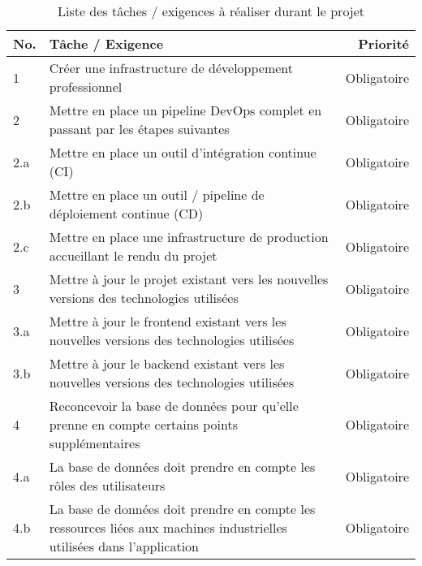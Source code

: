 \documentclass[
    iai, %
    il, %
]{heig-tb}
\begin{document}
\begin{table}[h]
    \begin{center}
        \caption{Liste des tâches / exigences à réaliser durant le projet \label{taches}}
        \begin{tabularx}{1.0\textwidth} {l|X|r}
            No. & Tâche / Exigence                                                                                                       & Priorité      \\ \hline
            1   & Créer une infrastructure de développement professionnel                                                                & Obligatoire   \\
            2   & Mettre en place un pipeline DevOps complet en passant par les étapes suivantes                                         & Obligatoire   \\
            2.a & Mettre en place un outil d'intégration continue (CI)                                                                   & Obligatoire   \\
            2.b & Mettre en place un outil / pipeline de déploiement continue (CD)                                                       & Obligatoire   \\
            2.c & Mettre en place une infrastructure de production accueillant le rendu du projet                                        & Obligatoire   \\
            3   & Mettre à jour le projet existant vers les nouvelles versions des technologies utilisées                                & Obligatoire   \\
            3.a & Mettre à jour le frontend existant vers les nouvelles versions des technologies utilisées                              & Obligatoire   \\
            3.b & Mettre à jour le backend existant vers les nouvelles versions des technologies utilisées                               & Obligatoire   \\
            4   & Reconcevoir la base de données pour qu'elle prenne en compte certains points supplémentaires                           & Obligatoire   \\
            4.a & La base de données doit prendre en compte les rôles des utilisateurs                                                   & Obligatoire   \\
            4.b & La base de données doit prendre en compte les ressources liées aux machines industrielles utilisées dans l'application & Obligatoire   \\

\end{tabularx}
\end{center}
\end{table}
\end{document}
